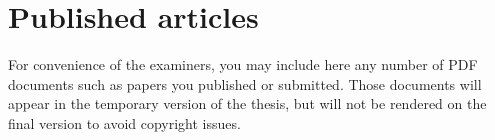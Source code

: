 \chapter*{Published articles} %

For convenience of the examiners, you may include here any number of PDF documents such as papers you published or submitted. Those documents will appear in the temporary version of the thesis, but will not be rendered on the final version to avoid copyright issues.

